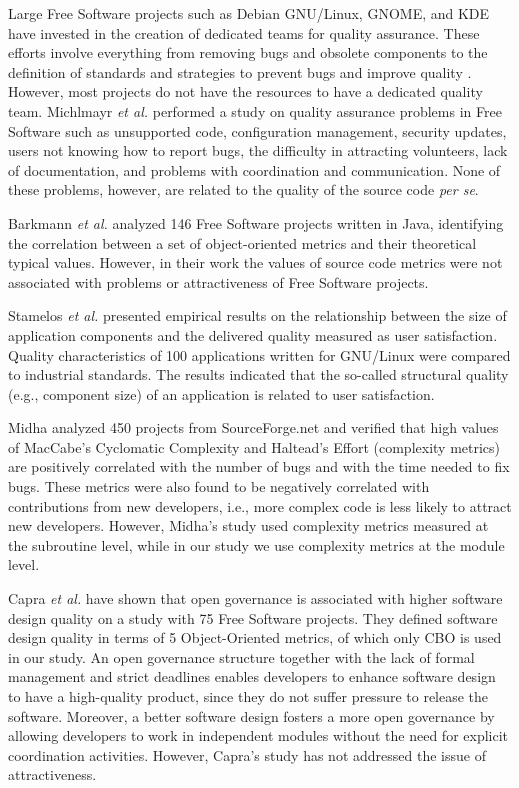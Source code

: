 \documentclass[conference]{IEEEtran}
\newcommand{\TODO}[1]{{\color{red}\textbf{\uwave{#1}}}}
\begin{document}
Large Free Software projects such as Debian GNU/Linux, GNOME, and KDE have invested in the
creation of dedicated teams for quality assurance. These efforts involve everything
from removing bugs and obsolete components to the definition of standards
and strategies to prevent bugs and improve quality \cite{Michlmayr2005}.
However, most projects do not have the resources to have a dedicated quality
team.
%
Michlmayr \emph{et al.} \cite{Michlmayr2005} performed a study on quality
assurance problems in Free Software such as unsupported code, configuration management,
security updates, users not knowing how to report bugs, the difficulty in
attracting volunteers, lack of documentation, and problems with coordination
and communication. None of these problems, however, are related to the quality
of the source code \emph{per se}.

Barkmann \emph{et al.} \cite{Barkmann2009} analyzed 146 Free Software projects
written in Java, identifying the correlation between a set of object-oriented
metrics and their theoretical typical values. 
%
However, in their work the values of source code metrics were not associated
with problems or attractiveness of Free Software projects.

Stamelos \emph{et al.} \cite{Stamelos2002} presented empirical results on the relationship
between the size of application components and the delivered quality
measured as user satisfaction.
%
Quality characteristics of 100 applications written for GNU/Linux were compared to
industrial standards. The results indicated that the so-called structural
quality (e.g., component size) of an application is related to user satisfaction.

Midha \cite{midha2008} analyzed 450 projects from SourceForge.net and
verified that high values of MacCabe's Cyclomatic Complexity and
Haltead's Effort (complexity metrics) are positively correlated
with the number of bugs and with the time needed to fix bugs.
%
These metrics were also found to be negatively correlated with
contributions from new developers, i.e., more complex code is less
likely to attract new developers. However, Midha's study used complexity metrics
measured at the subroutine level, while in our study we use
complexity metrics at the module level.

Capra \emph{et al.} \cite{capra2008} have shown that open governance is associated
with higher software design quality on a study with 75 Free Software projects.
They defined software design quality in terms of 5 Object-Oriented metrics,
of which only CBO is used in our study.
%
An open governance structure together with the lack of formal management and
strict deadlines enables developers to enhance software design to have a
high-quality product, since they do not suffer pressure to release the software. 
%
Moreover, a better software design fosters a more open governance by allowing
developers to work in independent modules without the need for
explicit coordination activities. However, Capra's study has not addressed the
issue of attractiveness.
\end{document}
